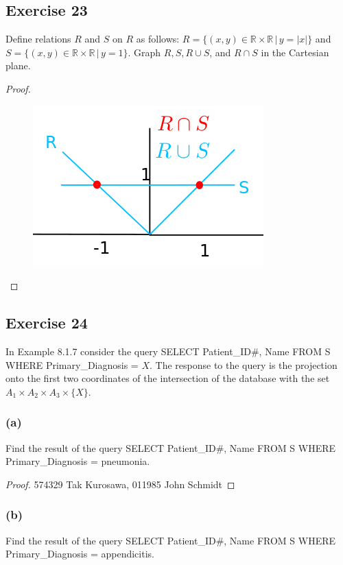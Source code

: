 \documentclass[14pt]{extarticle}
\newcommand{\R}{\mathbb{R}}
\begin{document}
\subsection{Exercise 23}
Define relations $R$ and $S$ on $R$ as follows: \(R = \{(x, y) \in \R \times \R \, | \, y = |x|\}\) and
\(S = \{(x, y) \in \R \times \R \, | \, y = 1\}\). Graph \(R, S, R \cup S\), and \(R \cap S\) in the Cartesian plane.

\begin{proof}
        \begin{figure}[ht!]
                \centering
                \includegraphics[scale=0.35]{../images/8.1.23.png}
        \end{figure}
\end{proof}

\subsection{Exercise 24}
In Example 8.1.7 consider the query SELECT Patient\_ID\#, Name FROM S WHERE Primary\_Diagnosis = $X$. The response to
the query is the projection onto the first two coordinates of the intersection of the database with the set
\(A_1 \times A_2 \times A_3 \times \{X\}\).

\subsubsection{(a)}
Find the result of the query SELECT Patient\_ID\#, Name FROM S WHERE Primary\_Diagnosis = pneumonia.

\begin{proof}
        574329 Tak Kurosawa, 011985 John Schmidt
\end{proof}

\subsubsection{(b)}
Find the result of the query SELECT Patient\_ID\#, Name FROM S WHERE Primary\_Diagnosis = appendicitis.
\end{document}
